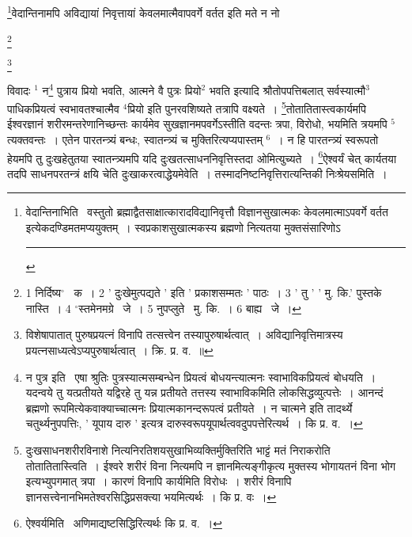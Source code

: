 \documentclass[11pt, openany]{book}
\newcommand\blfootnote[1]{%
 \begingroup
 \renewcommand\thefootnote{}\footnote{#1}%
 \addtocounter{footnote}{-1}%
 \endgroup
}
\begin{document}
\renewcommand{\thefootnote}{३}\footnote{वेदान्तिनाभिति \textendash\ वस्तुतो ब्रह्माद्वैतसाक्षात्कारादविद्यानिवृत्तौ विज्ञानसुखात्मकः केवलमात्माऽपवर्गे वर्तत इत्येकदण्डिमतमप्ययुक्तम्~। स्वप्रकाशसुखात्मकस्य ब्रह्मणो नित्यतया मुक्तसंसारिणोऽ \textendash\ \rule{0.4\linewidth}{0.5pt}}वेदान्तिनामपि अविद्यायां निवृत्तायां केवलमात्मैवापवर्गे वर्तत इति मते न नो

\blfootnote{1 निर्दिष्य$^\circ$ \textendash\ क~। 2 ' दुःखेमुत्पद्यते ' इति ' प्रकाशसम्मतः ' पाठः~। 3 ' तु ' ' मु. कि.' पुस्तके नास्ति~। 4  ${}^\circ$स्तमेनमग्रे  \textendash\ जे~। 5 नुपप्लुते  \textendash\ मु. कि.~। 6 बाह्य  \textendash\ जे~।}

\newpage
\blfootnote{विशेषापातात् पुरुषप्रयत्नं विनापि तत्सत्त्वेन तस्यापुरुषार्थत्वात्~। अविद्यानिवृत्तिमात्रस्य प्रयत्नसाध्यत्वेऽप्यपुरुषार्थत्वात्~। क्रि. प्र. व.~॥}
\noindent
विवादः ${}^1$ न\renewcommand{\thefootnote}{१}\footnote{न पुत्र इति \textendash\ एषा श्रुतिः पुत्रस्यात्मसम्बन्धेन प्रियत्वं बोधयन्त्यात्मनः स्वाभाविकप्रियत्वं बोधयति~। यदन्वये तु यत्प्रतीयते यद्विरहे तु यन्न प्रतीयते तत्तस्य स्वाभाविकमिति लोकसिद्धव्युत्पत्तेः~। आनन्दं ब्रह्मणो रूपमित्येकवाक्याच्चात्मनः प्रियात्मकानन्दरूपत्वं प्रतीयते~। न चात्मने इति तादर्थ्ये चतुर्थ्यनुपपत्तिः, ' यूपाय दारु ' इत्यत्र दारुस्वरूपयूपार्थत्ववदुपपत्तेरित्यर्थ~। कि प्र. व.~।} पुत्राय प्रियो भवति, आत्मने वै पुत्रः प्रियो$^2$ भवति इत्यादि श्रौतोपपत्तिबलात् सर्वस्यात्मौ$^3$पाधिकप्रियत्वं स्वभावतश्चात्मैव ${}^4$प्रियो इति पुनरवशिष्यते तत्रापि वक्ष्यते~। \renewcommand{\thefootnote}{२}\footnote{दुःखसाधनशरीरविनाशे नित्यनिरतिशयसुखाभिव्यक्तिर्मुक्तिरिति भाट्टं मतं निराकरोति तोतातितास्त्विति~। ईश्वरे शरीरं विना नित्यमपि न ज्ञानमित्यङ्गीकृत्य मुक्तस्य भोगायतनं विना भोग इत्यभ्युपगमात् त्रपा~। कारणं विनापि कार्यमिति विरोधः~। शरीरं विनापि ज्ञानसत्त्वेनानभिमतेश्वरसिद्धिप्रसक्त्या भयमित्यर्थः~। कि प्र. वः~।}तोतातितास्त्वकार्यमपि ईश्वरज्ञानं शरीरमन्तरेणानिच्छन्तः कार्यमेव सुखज्ञानमपवर्गेऽस्तीति वदन्तः त्रपा, विरोधो, भयमिति त्रयमपि ${}^5$त्यक्तवन्तः~। एतेन पारतन्त्र्यं बन्धः, स्वातन्त्र्यं च मुक्तिरित्यप्यपास्तम् ${}^6$~। न हि पारतन्त्र्यं स्वरूपतो हेयमपि तु दुःखहेतुतया स्वातन्त्र्यमपि यदि दुःखतत्साधननिवृत्तिस्तदा ओमित्युच्यते~। \renewcommand{\thefootnote}{३}\footnote{ऐश्वर्यमिति \textendash\ अणिमाद्यष्टसिद्धिरित्यर्थः कि प्र. व.~।}ऐश्वर्यं चेत् कार्यतया तदपि साधनपरतन्त्रं क्षयि चेति दुःखाकरत्वाद्धेयमेवेति~। तस्मादनिष्टनिवृत्तिरात्यन्तिकी निःश्रेयसमिति~।
\end{document}
